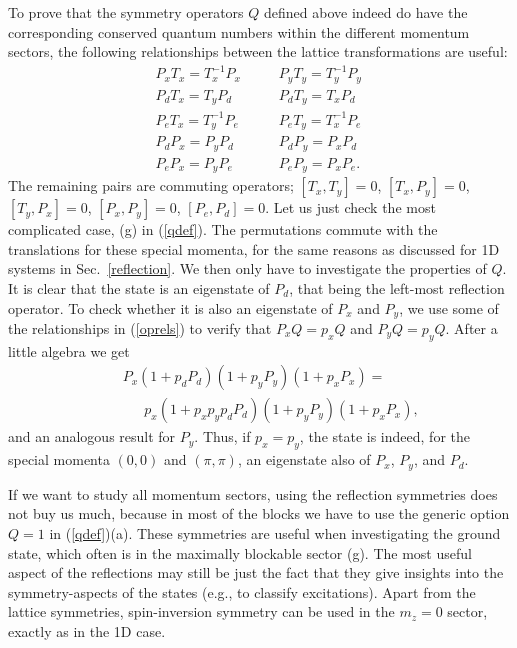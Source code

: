 \documentclass[draft,numberedheadings]{aipproc}
\begin{document}
To prove that the symmetry operators $Q$ defined above indeed do have the corresponding conserved quantum numbers within the different
momentum sectors, the following relationships between the lattice transformations are useful:
\begin{equation}
\begin{array}{lll}
P_xT_x=T^{-1}_xP_x~  & ~~~~ & P_yT_y=T^{-1}_yP_y \\
P_dT_x=T_yP_d~      & ~~~~ &  P_dT_y=T_xP_d     \\    
P_eT_x=T^{-1}_yP_e~  & ~~~~ &  P_eT_y=T^{-1}_xP_e~ \\
P_dP_x = P_yP_d~    & ~~~~ &  P_dP_y = P_xP_d~   \\
P_eP_x = P_yP_e~    & ~~~~ &  P_eP_y = P_xP_e.
\end{array}
\label{oprels}
\end{equation}
The remaining pairs are commuting operators; $[T_x,T_y]=0$, $[T_x,P_y]=0$, $[T_y,P_x]=0$, $[P_x,P_y]=0$, $[P_e,P_d]=0$.
Let us just check the most complicated case, (g) in (\ref{qdef}). The permutations commute with the translations for these special momenta, 
for the same reasons as discussed for 1D systems in Sec.~\ref{reflection}. We then only have to investigate the properties of $Q$. It is 
clear that the state is an eigenstate of $P_d$, that being the left-most reflection operator. To check whether it is also an eigenstate of 
$P_x$ and $P_y$, we use some of the relationships in (\ref{oprels}) to verify that $P_{x}Q=p_{x}Q$ and $P_{y}Q=p_{y}Q$. After a little 
algebra we get
\begin{eqnarray}
&&P_{x}(1+p_dP_d)(1+p_yP_y)(1+p_xP_x)=\nonumber \\
&&~~~~~~~p_{x}(1+p_xp_yp_dP_d)(1+p_yP_y)(1+p_xP_x),
\end{eqnarray}
and an analogous result for $P_y$. Thus, if $p_x=p_y$, the state is indeed, for the special momenta $(0,0)$ and $(\pi,\pi)$, an eigenstate also 
of $P_x$, $P_y$, and $P_d$. 

If we want to study all momentum sectors, using the reflection symmetries does not buy us much, because in most of the blocks we have 
to use the generic option $Q=1$ in (\ref{qdef})(a). These symmetries are useful when investigating the ground state, which often is 
in the maximally blockable sector (g). The most useful aspect of the reflections may still be 
just the fact that they give insights into the symmetry-aspects of the states (e.g., to classify excitations). Apart from the lattice symmetries, 
spin-inversion symmetry can be used in the $m_z=0$ sector, exactly as in the 1D case.
\end{document}
